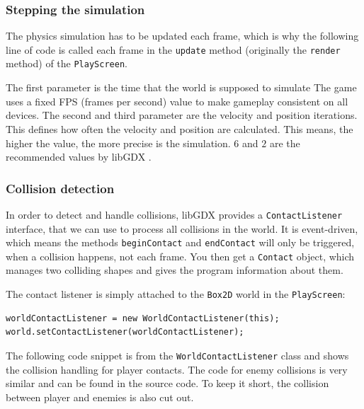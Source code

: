\documentclass[12p]{article}
\begin{document}

\subsubsection{Stepping the simulation} \label{DocSteppingTheSimulation}

The physics simulation has to be updated each frame, which is why the following line of code is called each frame in the \texttt{update} method (originally the \texttt{render} method) of the \texttt{PlayScreen}.


The first parameter is the time that the world is supposed to simulate The game uses a fixed FPS (frames per second) value to make gameplay consistent on all devices. The second and third parameter are the velocity and position iterations. This defines how often the velocity and position are calculated. This means, the higher the value, the more precise is the simulation. $6$ and $2$ are the recommended values by libGDX \cite{stepValues}.


\subsubsection{Collision detection} \label{DocCollisionDetection}

In order to detect and handle collisions, libGDX provides a \texttt{ContactListener} interface, that we can use to process all collisions in the world. It is event-driven, which means the methods \texttt{beginContact} and \texttt{endContact} will only be triggered, when a collision happens, not each frame. You then get a \texttt{Contact} object, which manages two colliding shapes and gives the program information about them.

The contact listener is simply attached to the \texttt{Box2D} world in the \texttt{PlayScreen}:

\begin{verbatim}
worldContactListener = new WorldContactListener(this);
world.setContactListener(worldContactListener);
\end{verbatim}

The following code snippet is from the \texttt{WorldContactListener} class and shows the collision handling for player contacts. The code for enemy collisions is very similar and can be found in the source code. To keep it short, the collision between player and enemies is also cut out.
\end{document}
